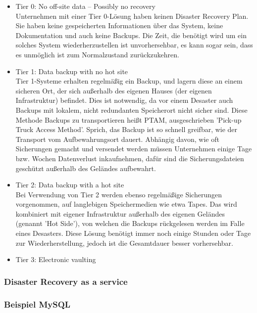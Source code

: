 \documentclass[letterpaper, 12pt]{article}
\let\tempsubsubsection\subsubsection
\renewcommand\subsubsection[1]{\vspace{0cm}\tempsubsubsection{#1}\vspace{0cm}}
\begin{document}
\begin{itemize}
	\item Tier 0: No off-site data – Possibly no recovery \\
	Unternehmen mit einer Tier 0-Lösung haben keinen Disaster Recovery Plan. Sie haben keine gespeicherten Informationen über das System, keine Dokumentation und auch keine Backups. Die Zeit, die benötigt wird um ein solches System wiederherzustellen ist unvorhersehbar, es kann sogar sein, dass es unmöglich ist zum Normalzustand zurückzukehren.
	\item Tier 1: Data backup with no hot site \\
	Tier 1-Systeme erhalten regelmäßig ein Backup, und lagern diese an einem sicheren Ort, der sich außerhalb des eigenen Hauses (der eigenen Infrastruktur) befindet. Dies ist notwendig, da vor einem Desaster auch Backups mit lokalem, nicht redundanten Speicherort nicht sicher sind. Diese Methode Backups zu transportieren heißt PTAM, ausgeschrieben 'Pick-up Truck Access Method'. Sprich, das Backup ist so schnell greifbar, wie der Transport vom Aufbewahrungsort dauert. Abhängig davon, wie oft Sicherungen gemacht und versendet werden müssen Unternehmen einige Tage bzw. Wochen Datenverlust inkaufnehmen, dafür sind die Sicherungsdateien geschützt außerhalb des Geländes aufbewahrt.
	\item Tier 2: Data backup with a hot site \\
	Bei Verwendung von Tier 2 werden ebenso regelmäßige Sicherungen vorgenommen, auf langlebigen Speichermedien wie etwa Tapes. Das wird kombiniert mit eigener Infrastruktur außerhalb des eigenen Geländes (genannt 'Hot Side'), von welchen die Backups rückgelesen werden im Falle eines Desasters. Diese Lösung benötigt immer noch einige Stunden oder Tage zur Wiederherstellung, jedoch ist die Gesamtdauer besser vorhersehbar.
	\item Tier 3: Electronic vaulting \\
	
\end{itemize}

\subsubsection{Disaster Recovery as a service}

\subsubsection{Beispiel MySQL}

\clearpage



\listoffigures
\end{document}
